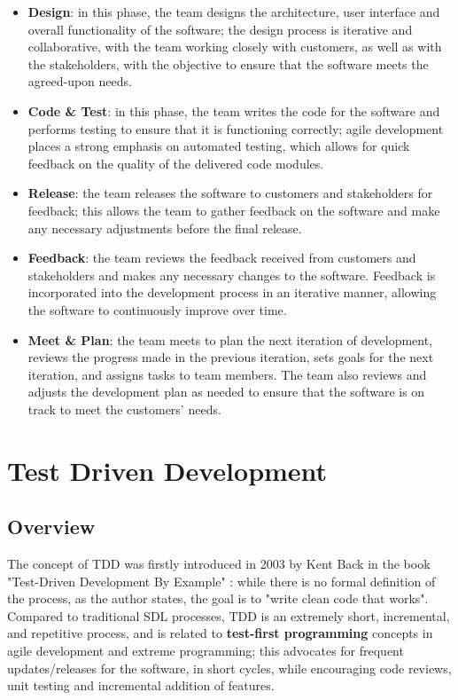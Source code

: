 \begin{itemize}
    \item \textbf{Design}: in this phase, the team designs the architecture, user interface and overall functionality of the software; the design process is iterative and collaborative, with the team working closely with customers, as well as with the stakeholders, with the objective to ensure that the software meets the agreed-upon needs.
    \item \textbf{Code \& Test}: in this phase, the team writes the code for the software and performs testing to ensure that it is functioning correctly; agile development places a strong emphasis on automated testing, which allows for quick feedback on the quality of the delivered code modules.
    \item \textbf{Release}: the team releases the software to customers and stakeholders for feedback; this allows the team to gather feedback on the software and make any necessary adjustments before the final release.
    \item \textbf{Feedback}: the team reviews the feedback received from customers and stakeholders and makes any necessary changes to the software. Feedback is incorporated into the development process in an iterative manner, allowing the software to continuously improve over time.
    \item \textbf{Meet \& Plan}: the team meets to plan the next iteration of development, reviews the progress made in the previous iteration, sets goals for the next iteration, and assigns tasks to team members. The team also reviews and adjusts the development plan as needed to ensure that the software is on track to meet the customers' needs.
\end{itemize}


\section{Test Driven Development}
\subsection{Overview}
The concept of TDD was firstly introduced in 2003 by Kent Back in the book "Test-Driven Development By Example" \cite{TDDByExample}: while there is no formal definition of the process, as the author states, the goal is to "write clean code that works".
Compared to traditional SDL processes, TDD is an extremely short, incremental, and repetitive process, and is related to \textbf{test-first programming} concepts in agile development and extreme programming; this advocates for frequent updates/releases for the software, in short cycles, while encouraging code reviews, unit testing and incremental addition of features.


